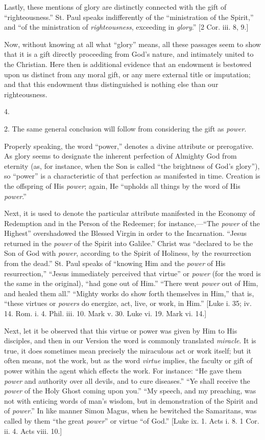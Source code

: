 Lastly, these mentions of glory are distinctly connected with the
gift of ``righteousness.'' St. Paul speaks indifferently of
the ``ministration of the Spirit,'' and ``of the
ministration of \emph{righteousness}, exceeding in \emph{glory}.''
[2 Cor. iii. 8, 9.]

Now, without knowing at all what ``glory'' means, all these
passages seem to show that it is a gift directly proceeding from God's
nature, and intimately united to the Christian. Here then is
additional evidence that an endowment is bestowed upon us distinct
from any moral gift, or any mere external title or imputation; and
that this endowment thus distinguished is nothing else than our
righteousness.

4.

2. The same general conclusion will follow from considering the
gift as \emph{power}.

Properly speaking, the word ``power,'' denotes a divine
attribute or prerogative. As glory seems to designate the inherent
perfection of Almighty God from eternity (as, for instance, when the
Son is called ``the brightness of God's glory''), so
``power'' is a characteristic of that perfection as manifested
in time. Creation is the offspring of His \emph{power}; again, He
``upholds all things by the word of His \emph{power}.''

Next, it is used to denote the particular attribute manifested in
the Economy of Redemption and in the Person of the Redeemer; for
instance,—``The \emph{power} of the Highest'' overshadowed
the Blessed Virgin in order to the Incarnation. ``Jesus returned
in the \emph{power} of the Spirit into Galilee.'' Christ was
``declared to be the Son of God with \emph{power}, according to
the Spirit of Holiness, by the resurrection from the dead.'' St.
Paul speaks of ``knowing Him and the \emph{power} of His
resurrection,'' ``Jesus immediately perceived that
virtue'' or \emph{power} (for the word is the same in the
original), ``had gone out of Him.'' ``There went \emph{power}
out of Him, and healed them all.'' ``Mighty works do show
forth themselves in Him,'' that is, ``these virtues or \emph{powers}
do energize, act, live, or work, in Him.'' [Luke i. 35; iv. 14.
Rom. i. 4. Phil. iii. 10. Mark v. 30. Luke vi. 19. Mark vi. 14.]

Next, let it be observed that this virtue or power was given by Him
to His disciples, and then in our Version the word is commonly
translated \emph{miracle}. It is true, it does sometimes mean
precisely the miraculous act or work itself; but it often means, not
the work, but as the word \emph{virtue} implies, the faculty or gift
of power within the agent which effects the work. For instance:
``He gave them \emph{power} and authority over all devils, and to
cure diseases.'' ``Ye shall receive the \emph{power} of the
Holy Ghost coming upon you.'' ``My speech, and my preaching,
was not with enticing words of man's wisdom, but in demonstration of
the Spirit and of \emph{power}.'' In like manner Simon Magus, when
he bewitched the Samaritans, was called by them ``the great \emph{power}''
or virtue ``of God.'' [Luke ix. 1. Acts i. 8. 1 Cor. ii. 4.
Acts viii. 10.]

